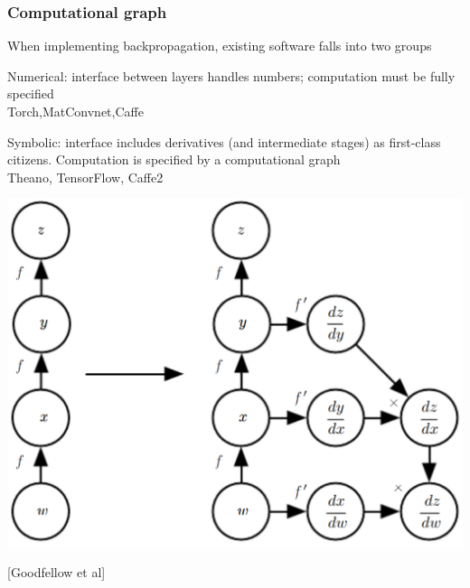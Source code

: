 \documentclass[xcolor=dvipsnames]{beamer}
\begin{document}
\begin{frame}
  \frametitle{Computational graph}
  \bi
\item When implementing backpropagation, existing software falls into
  two groups
\item Numerical: interface between layers handles numbers; computation
  must be fully specified\\
Torch,MatConvnet,Caffe
\ei
  \begin{minipage}[c]{.5\linewidth}
\bi
\item Symbolic: interface includes derivatives (and
  intermediate stages) as first-class citizens. Computation is
  specified by a computational graph\\
Theano, TensorFlow, Caffe2
   
\ei
  \end{minipage}%
  \begin{minipage}[c]{.5\linewidth}
\includegraphics[width=.95\textwidth]{gcb-compgraph-example}

[Goodfellow et al]    
  \end{minipage}





\end{frame}
\end{document}
